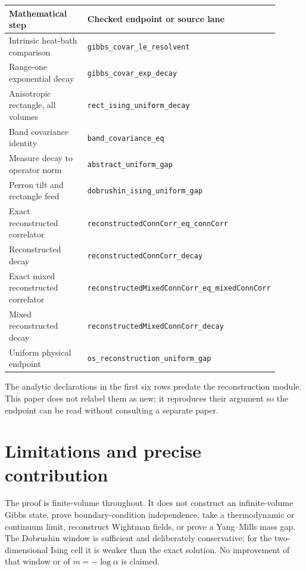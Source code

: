 \documentclass[11pt]{article}
\theoremstyle{definition}
\theoremstyle{remark}
\newcommand{\lean}[1]{\nolinkurl{#1}}
\begin{document}
\begin{center}\small
\begin{tabular}{>{\raggedright\arraybackslash}p{0.40\linewidth}
                >{\raggedright\arraybackslash}p{0.50\linewidth}}
\toprule
Mathematical step & Checked endpoint or source lane\\
\midrule
Intrinsic heat-bath comparison & \lean{gibbs\_covar\_le\_resolvent}\\
Range-one exponential decay & \lean{gibbs\_covar\_exp\_decay}\\
Anisotropic rectangle, all volumes & \lean{rect\_ising\_uniform\_decay}\\
Band covariance identity & \lean{band\_covariance\_eq}\\
Measure decay to operator norm & \lean{abstract\_uniform\_gap}\\
Perron tilt and rectangle feed & \lean{dobrushin\_ising\_uniform\_gap}\\
Exact reconstructed correlator & \lean{reconstructedConnCorr\_eq\_connCorr}\\
Reconstructed decay & \lean{reconstructedConnCorr\_decay}\\
Exact mixed reconstructed correlator & \lean{reconstructedMixedConnCorr\_eq\_mixedConnCorr}\\
Mixed reconstructed decay & \lean{reconstructedMixedConnCorr\_decay}\\
Uniform physical endpoint & \lean{os\_reconstruction\_uniform\_gap}\\
\bottomrule
\end{tabular}
\end{center}

The analytic declarations in the first six rows predate the reconstruction
module.  This paper does not relabel them as new; it reproduces their argument
so the endpoint can be read without consulting a separate paper.

\section{Limitations and precise contribution}

The proof is finite-volume throughout.  It does not construct an
infinite-volume Gibbs state, prove boundary-condition independence, take a
thermodynamic or continuum limit, reconstruct Wightman fields, or prove a
Yang--Mills mass gap.  The Dobrushin window is sufficient and deliberately
conservative; for the two-dimensional Ising cell it is weaker than the exact
solution.  No improvement of that window or of $m=-\log\alpha$ is claimed.
\end{document}
